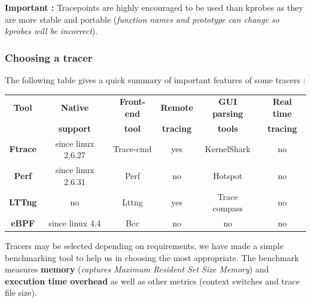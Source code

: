 \begin{center}
\end{center}


\textbf{\color{orange}Important : } Tracepoints are highly encouraged to be used than kprobes as they are more stable and portable (\textit{function names and prototype can change so kprobes will be incorrect}).
\subsubsection{Choosing a tracer}
The following table gives a quick summary of important features of some tracers :
\begin{center}
	\begin{tabular}{|c|c|c|c|c|c|}
		\hline
			\rowcolor{LightCyan}
			\textbf{Tool} & \textbf{Native} & \textbf{Front-end} & \textbf{Remote} & \textbf{GUI parsing} & \textbf{Real time} \\	
						\rowcolor{LightCyan}   
			 & \textbf{support} & \textbf{tool} & \textbf{tracing} & \textbf{tools} & \textbf{tracing} \\	 		
   		\hline
	    	\textbf{Ftrace} & since linux 2.6.27 & Trace-cmd & yes & KernelShark & no \\
	    \hline
	    	\textbf{Perf} & since linux 2.6.31 & Perf & no & Hotspot & no \\
		\hline     
        	\textbf{LTTng} & no & Lttng & yes & Trace compass & no \\
		\hline     
        	\textbf{eBPF} & since linux 4.4 & Bcc & no & no & no \\
   		\hline
	\end{tabular}
\end{center}

Tracers may be selected depending on requirements, we have made a simple benchmarking tool to help us in choosing the most appropriate. The benchmark measures \textbf{memory} (\textit{captures Maximum Resident Set Size Memory}) and \textbf{execution time overhead} as well as other metrics (context switches and trace file size).

